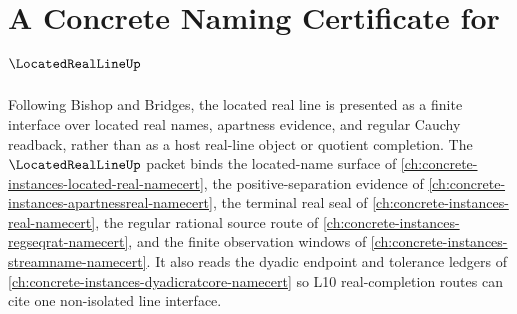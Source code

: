 \chapter{A Concrete Naming Certificate for $\LocatedRealLineUp$}
\label{ch:concrete-instances-located-real-line-namecert}

Following Bishop and Bridges, the located real line is presented as a finite interface over located real names, apartness evidence, and regular Cauchy readback, rather than as a host real-line object or quotient completion. The $\LocatedRealLineUp$ packet binds the located-name surface of \autoref{ch:concrete-instances-located-real-namecert}, the positive-separation evidence of \autoref{ch:concrete-instances-apartnessreal-namecert}, the terminal real seal of \autoref{ch:concrete-instances-real-namecert}, the regular rational source route of \autoref{ch:concrete-instances-regseqrat-namecert}, and the finite observation windows of \autoref{ch:concrete-instances-streamname-namecert}. It also reads the dyadic endpoint and tolerance ledgers of \autoref{ch:concrete-instances-dyadicratcore-namecert} so L10 real-completion routes can cite one non-isolated line interface.


